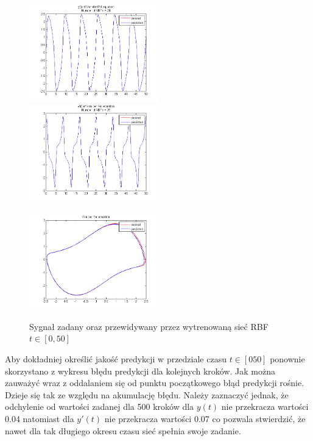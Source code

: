 \begin{figure}[ht!]
	\centering

	\subfloat
	{\includegraphics[width=0.5\textwidth]
	{images/signal_pred400.png}}
	\subfloat
	{\includegraphics[width=0.5\textwidth]
	{images/deriv_pred400.png}}	
	
	\subfloat
	{\includegraphics[width=0.5\textwidth]
	{images/trajectory_pred400.png}}

	\caption{Sygnał zadany oraz przewidywany przez wytrenowaną sieć RBF $t \in [0,50]$}
	\label{img:predicted2}
\end{figure}

Aby dokładniej określić jakość predykcji w przedziale czasu $t \in [0 50]$ ponownie skorzystano z wykresu błędu predykcji dla kolejnych kroków. Jak można zauważyć wraz z oddalaniem się od punktu początkowego błąd predykcji rośnie. Dzieje się tak ze względu na akumulację błędu. Należy zaznaczyć jednak, że odchylenie od wartości zadanej dla 500 kroków dla $y(t)$ nie przekracza wartości 0.04 natomiast dla $y'(t)$ nie przekracza wartości 0.07 co pozwala stwierdzić, że nawet dla tak długiego okresu czasu sieć spełnia swoje zadanie.

